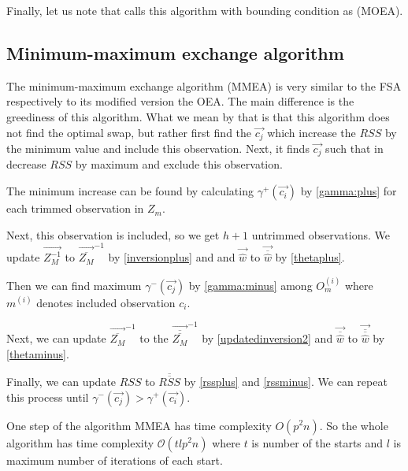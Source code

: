 Finally, let us note that \cite{agullo2001new} calls this algorithm with bounding condition as  (MOEA).




\subsection{Minimum-maximum exchange algorithm}
The minimum-maximum exchange algorithm (MMEA) is very similar to the FSA respectively to its modified version the OEA. The main difference is the greediness of this algorithm. What we mean by that is that this algorithm does not find the optimal swap, but rather first find the $\vec{c_j}$  which increase the $RSS$ by the minimum value and include this observation.
Next, it finds $\vec{c_j}$ such that in decrease $RSS$ by maximum and exclude this observation.

The minimum increase can be found by calculating $\gamma^{+}(\vec{c_i}) $ by \ref{gamma:plus} for each trimmed observation in  $Z_m$.

Next, this observation is included, so we get $h+1$ untrimmed observations. We update 
$\vec{Z_M^{-1}}$ to  $\vec{\overline{Z_M}}^{-1}$ by \eqref{inversionplus} and  and $\vec{\hat{w}}$ to $\vec{\overline{\hat{w}}}$ by \eqref{thetaplus}.

Then we can find maximum  $\gamma^{-}(\vec{c_j})$ by \eqref{gamma:minus} among $O_m^{(i)}$ where $m^{(i)}$ denotes included observation $c_i$.

Next, we can update $\vec{\overline{Z_M}}^{-1}$ to the   $\vec{\overline{\overline{Z_M}}}^{-1}$ by \eqref{updatedinversion2} and 
$\vec{\overline{\hat{w}}}$ to $\vec{\overline{\overline{\hat{w}}}}$ by 
\eqref{thetaminus}.

Finally, we can update $RSS$ to $\overline{\overline{RSS}}$ by \ref{rssplus} and  \ref{rssminus}. We can repeat this process until $\gamma^{-}(\vec{c_j}) > \gamma^{+}(\vec{c_i})$.

\begin{observation} \label{timecomplexitymmea}
    One step of the algorithm MMEA has time complexity $O(p^2n)$. So the whole algorithm has time complexity $\mathcal{O}(tlp^2n)$ where $t$ is number of the starts and $l$ is maximum number of iterations of each start.
\end{observation}


